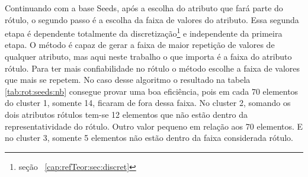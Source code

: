 Continuando com a base Seeds, após a escolha do atributo que fará parte do rótulo, o segundo passo é a escolha da faixa de valores do atributo. Essa segunda etapa é dependente totalmente da discretização\footnote{seção ~\ref{cap:refTeor:sec:discret}} e independente da primeira etapa. O método é capaz de gerar a faixa de maior repetição de valores de qualquer atributo, mas aqui neste trabalho o que importa é a faixa do atributo rótulo. Para ter mais  confiabilidade  no rótulo o método escolhe a faixa de valores que mais se repetem. No caso desse algoritmo o resultado na tabela \ref{tab:rot:seeds:nb} consegue provar uma boa eficiência, pois em cada 70 elementos do cluster 1, somente 14, ficaram de fora dessa faixa. No cluster 2, somando os dois atributos rótulos tem-se 12 elementos que não estão dentro da representatividade do rótulo. Outro valor pequeno em relação aos 70 elementos. E no cluster 3, somente 5 elementos não estão dentro da faixa considerada rótulo.


